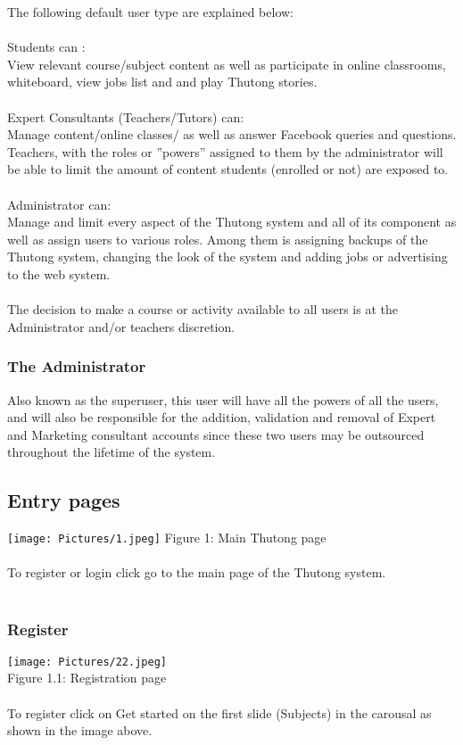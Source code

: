 \documentclass[english]{article}
\begin{document}
The following default user type are explained below: \\\\
Students can : \\
View relevant course/subject content as well as participate in online classrooms, whiteboard, view jobs list and and play Thutong stories. \\\\
Expert Consultants (Teachers/Tutors) can: \\ 
Manage content/online classes/ as well as answer Facebook queries and questions. Teachers, with the roles or ”powers” assigned to them by the administrator will be able to limit the amount of content students (enrolled or not) are exposed to. \\\\
Administrator can: \\ 
Manage and limit every aspect of the Thutong system and all of its component as well as assign users to various roles. Among them is assigning backups of the Thutong system, changing the look of the system and adding jobs or advertising to the web system. \\\\
The decision to make a course or activity available to all users is at the Administrator and/or teachers discretion.

\subsubsection{The Administrator}
Also known as the superuser, this user will have all the powers of all the users, and will also be responsible for the addition, validation and removal of Expert and Marketing consultant accounts since these two users may be outsourced throughout the lifetime of the system.


		\subsection{Entry pages}
\texttt{[image: Pictures/1.jpeg]}
Figure 1: Main Thutong page\\\\		
To register or login click go to the main page of the Thutong system.\\\\

\subsubsection{Register}
\texttt{[image: Pictures/22.jpeg]} \\
Figure 1.1: Registration page\\\\
To register click on Get started on the first slide (Subjects) in the carousal as shown in the image above.\\\\
\end{document}

